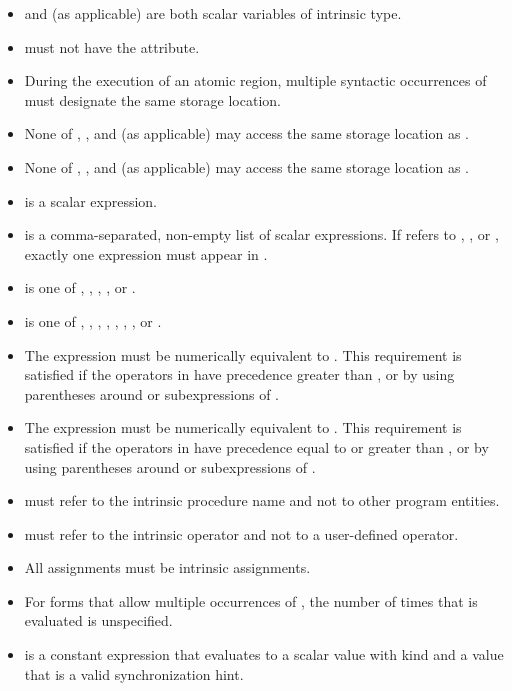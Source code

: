 \begin{fortranspecific}
\begin{itemize}
\item {} and  (as applicable) are both scalar variables of intrinsic type.
\item {} must not have the  attribute.
\item During the execution of an atomic region, multiple syntactic occurrences 
      of  must designate the same storage location.
\item None of , , and  (as applicable) may access 
      the same storage location as .
\item None of , , and  (as applicable) may access 
      the same storage location as .
\item {} is a scalar expression.
\item {} is a comma-separated, non-empty list of scalar expressions. 
      If  refers to , , or 
      , exactly one expression must appear in .
\item {} is one of , , 
      , , or .
\item {} is one of \code{+}, \code{*}, \code{-}, \code{/}, 
      , , , or .
\item The expression  must be numerically equivalent to 
      . This requirement is satisfied if the operators 
      in  have precedence greater than , or by using 
      parentheses around  or subexpressions of .
\item The expression  must be numerically equivalent to 
      . This requirement is satisfied if the operators 
      in  have precedence equal to or greater than , or 
      by using parentheses around  or subexpressions of .
\item {} must refer to the intrinsic procedure name 
      and not to other program entities.
\item {} must refer to the intrinsic operator and not to a 
      user-defined operator.
\item All assignments must be intrinsic assignments.
\item For forms that allow multiple occurrences of , the number of times 
      that  is evaluated is unspecified.
\item {} is a constant expression that evaluates to a 
      scalar value with kind  and a value that is a 
      valid synchronization hint.
\end{itemize}
\end{fortranspecific}

